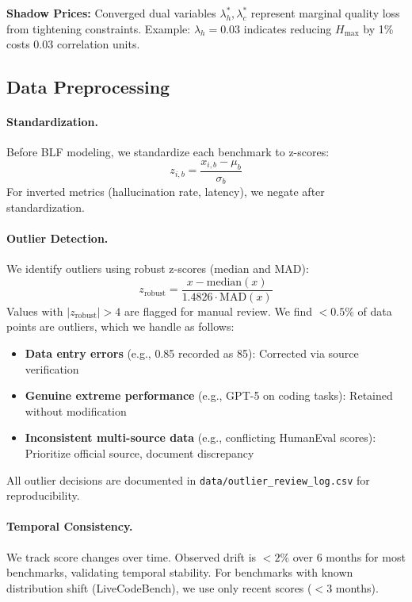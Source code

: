 \textbf{Shadow Prices:} Converged dual variables $\lambda_h^*, \lambda_c^*$ represent marginal quality loss from tightening constraints. Example: $\lambda_h = 0.03$ indicates reducing $H_{\max}$ by 1\% costs 0.03 correlation units.

\subsection{Data Preprocessing}

\paragraph{Standardization.}
Before BLF modeling, we standardize each benchmark to z-scores:
%
\begin{equation}
z_{i,b} = \frac{x_{i,b} - \mu_b}{\sigma_b}
\end{equation}
%
For inverted metrics (hallucination rate, latency), we negate after standardization.

\paragraph{Outlier Detection.}
We identify outliers using robust z-scores (median and MAD):
%
\begin{equation}
z_{\text{robust}} = \frac{x - \text{median}(x)}{1.4826 \cdot \text{MAD}(x)}
\end{equation}
%
Values with $|z_{\text{robust}}| > 4$ are flagged for manual review. We find $<0.5\%$ of data points are outliers, which we handle as follows:
%
\begin{itemize}[topsep=2pt,itemsep=1pt]
    \item \textbf{Data entry errors} (e.g., 0.85 recorded as 85): Corrected via source verification
    \item \textbf{Genuine extreme performance} (e.g., GPT-5 on coding tasks): Retained without modification
    \item \textbf{Inconsistent multi-source data} (e.g., conflicting HumanEval scores): Prioritize official source, document discrepancy
\end{itemize}
%
All outlier decisions are documented in \texttt{data/outlier\_review\_log.csv} for reproducibility.

\paragraph{Temporal Consistency.}
We track score changes over time. Observed drift is $<2\%$ over 6 months for most benchmarks, validating temporal stability. For benchmarks with known distribution shift (LiveCodeBench), we use only recent scores ($<3$ months).

